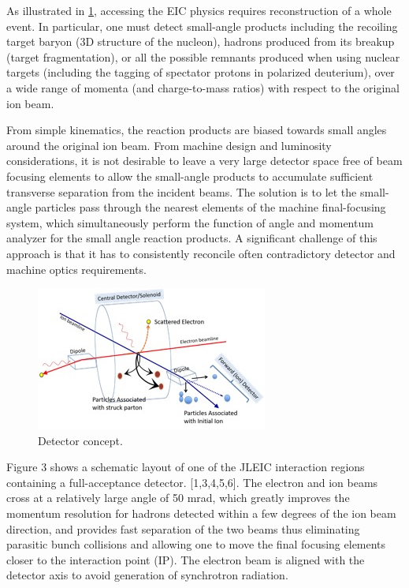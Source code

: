 As illustrated in \ref{fig:detector_concept}, accessing the EIC physics requires reconstruction of a whole event. In particular, one must detect small-angle products including the recoiling target baryon (3D structure of the nucleon), hadrons produced from its breakup (target fragmentation), or all the possible remnants produced when using nuclear targets (including the tagging of spectator protons in polarized deuterium), over a wide range of momenta (and charge-to-mass ratios) with respect to the original ion beam.

From simple kinematics, the reaction products are biased towards small angles around the original ion beam. From machine design and luminosity considerations, it is not desirable to leave a very large detector space free of beam focusing elements to allow the small-angle products to accumulate sufficient transverse separation from the incident beams. The solution is to let the small-angle particles pass through the nearest elements of the machine final-focusing system, which simultaneously perform the function of angle and momentum analyzer for the small angle reaction products. A significant challenge of this approach is that it has to consistently reconcile often contradictory detector and machine optics requirements.

\begin{figure}
	\centering
	\includegraphics[width=.75\textwidth]{../../img/central_detector.jpg}
	\caption{Detector concept.}
	\label{fig:detector_concept}
\end{figure}

Figure 3 shows a schematic layout of one of the JLEIC interaction regions containing a full-acceptance detector.  [1,3,4,5,6]. 
The electron and ion beams cross at a relatively large angle of 50 mrad, which greatly improves the momentum resolution for hadrons detected within a few degrees of the ion beam direction, and provides fast separation of the two beams thus eliminating parasitic bunch collisions and allowing one to move the final focusing elements closer to the interaction point (IP). The electron beam is aligned with the detector axis to avoid generation of synchrotron radiation.


